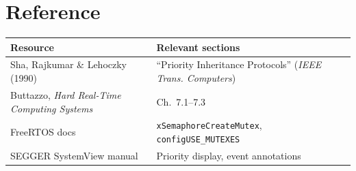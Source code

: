 \documentclass[11pt, a4paper]{article}
\begin{document}
\section{Reference}

\renewcommand{\arraystretch}{1.3}
\begin{tabular}{@{} p{5.5cm} p{7.5cm} @{}}
  \toprule
  \textbf{Resource} & \textbf{Relevant sections} \\
  \midrule
  Sha, Rajkumar \& Lehoczky (1990) &
    ``Priority Inheritance Protocols'' (\textit{IEEE Trans. Computers}) \\
  Buttazzo, \textit{Hard Real-Time Computing Systems} & Ch.~7.1--7.3 \\
  FreeRTOS docs & \texttt{xSemaphoreCreateMutex}, \texttt{configUSE\_MUTEXES} \\
  SEGGER SystemView manual & Priority display, event annotations \\
  \bottomrule
\end{tabular}
\renewcommand{\arraystretch}{1}
\end{document}
